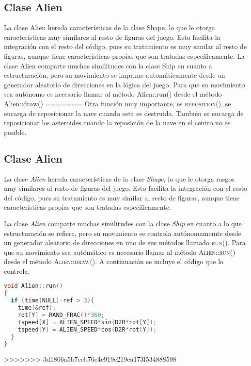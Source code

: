 \subsection{Clase Alien}
La clase Alien hereda características de la clase Shape, lo que le otorga características muy similares al resto de figuras del juego. Esto facilita la integración con el resto del código, pues su tratamiento es muy similar al resto de figuras, aunque tiene características propias que son tratadas específicamente. La clase Alien comparte muchas similitudes con la clase Ship en cuanto a estructuración, pero su movimiento se imprime automáticamente desde un generador aleatorio de direcciones en la lógica del juego. Para que su movimiento sea autónomo es necesario llamar al método Alien::run() desde el método Alien::draw()
=======
Otra función muy importante, es \textsc{reposition()}, se encarga de reposicionar la nave cuando esta es destruida. También se encarga de reposicionar los asteroides cuando la reposición de la nave en el centro no es posible.

\subsection{Clase Alien}
La clase \emph{Alien} hereda características de la clase \emph{Shape}, lo que le otorga rasgos muy similares al resto de figuras del juego. 
Esto facilita la integración con el resto del código, pues su tratamiento es muy similar al resto de figuras, aunque tiene características propias que son tratadas específicamente. 

La clase \emph{Alien} comparte muchas similitudes con la clase \emph{Ship} en cuanto a lo que estructuración se refiere, pero su movimiento se controla autónomamemte desde un generador aleatorio de direcciones en uno de sus métodos llamado \textsc{run()}. Para que su movimiento sea autómático es necesario llamar al método \textsc{Alien::run()} desde el método \textsc{Alien::draw()}. A continuación se incluye el código que lo controla:

\lstset{style=mystyle}
\begin{lstlisting}[language=C++, title=Movimiento errático del \emph{Alien} gracias a la función \textit{run()}, frame=single, numbers=none]
void Alien::run()
{ 
  if (time(NULL)-ref > 3){
    time(&ref);
    rot[Y] = RAND_FRAC()*360;
    tspeed[X] = ALIEN_SPEED*sin(D2R*rot[Y]);
    tspeed[Y] = ALIEN_SPEED*cos(D2R*rot[Y]);
  }
}
\end{lstlisting}
>>>>>>> 3d1866a5b7eeb76e4e919e219ca173f534888598
